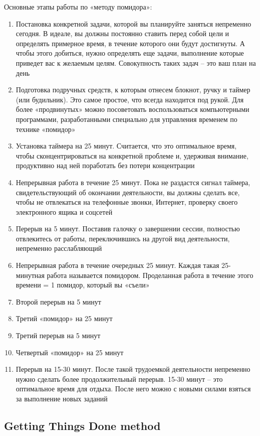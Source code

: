 \documentclass{../industrial-development}
\begin{document}
\lecturenotes

Основные этапы работы по «методу помидора»:
\begin{enumerate}
  \item Постановка конкретной задачи, которой вы планируйте заняться непременно сегодня. В идеале, вы должны постоянно ставить перед собой цели и определять примерное время, в течение которого они будут достигнуты. А чтобы этого добиться, нужно определять еще задачи,  выполнение которые приведет вас к желаемым целям.  Совокупность таких задач – это ваш план на день
  \item Подготовка подручных средств, к которым отнесем блокнот, ручку и таймер (или будильник). Это самое простое, что всегда находится под рукой. Для более «продвинутых» можно посоветовать воспользоваться компьютерными программами, разработанными специально для управления временем по технике «помидор»
  \item Установка таймера на 25 минут. Считается, что это оптимальное время, чтобы сконцентрироваться на конкретной проблеме и, удерживая внимание, продуктивно над ней поработать без потери концентрации
  \item Непрерывная работа в течение 25 минут. Пока не раздастся сигнал таймера, свидетельствующий об окончании деятельности, вы должны сделать все, чтобы не отвлекаться на телефонные звонки, Интернет, проверку своего электронного ящика и соцсетей
  \item Перерыв на 5 минут. Поставив галочку о завершении сессии, полностью отвлекитесь от работы, переключившись на другой вид деятельности, непременно расслабляющий
  \item Непрерывная работа в течение очередных 25 минут. Каждая такая 25-минутная работа называется помидором. Проделанная работа в течение этого времени = 1 помидор, который вы «съели»
  \item Второй перерыв на 5 минут
  \item Третий «помидор» на 25 минут
  \item Третий перерыв на 5 минут
  \item Четвертый «помидор» на 25 минут
  \item Перерыв на 15-30 минут. После такой трудоемкой деятельности непременно нужно сделать более продолжительный перерыв. 15-30 минут – это оптимальное время для отдыха. После него можно с новыми силами взяться за выполнение новых заданий~\cite{Pomidoro}
\end{enumerate}

\subsection{Getting Things Done method}
\end{document}
